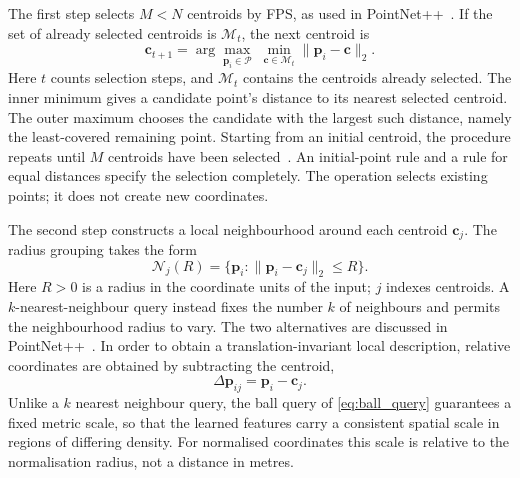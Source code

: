 The first step selects $M < N$ centroids by
\ac{FPS}, as used in PointNet++~\cite{qi2017pointnetpp}. If the set of already selected centroids is
$\mathcal{M}_t$, the next centroid is
%
\begin{equation}
    \label{eq:fps}
    \mathbf{c}_{t+1}
    = \arg\max_{\mathbf{p}_i \in \mathcal{P}}\;
      \min_{\mathbf{c} \in \mathcal{M}_t} \big\| \mathbf{p}_i - \mathbf{c} \big\|_2 .
\end{equation}
%
Here $t$ counts selection steps, and $\mathcal M_t$ contains the
centroids already selected. The inner minimum gives a candidate point's
distance to its nearest selected centroid. The outer maximum chooses the
candidate with the largest such distance, namely the least-covered
remaining point. Starting from an initial centroid, the procedure repeats
until $M$ centroids have been selected~\cite{qi2017pointnetpp}.
An initial-point rule and a rule for equal distances specify the selection
completely. The operation selects existing points; it does not create
new coordinates.

The second step constructs a local neighbourhood
around each centroid $\mathbf{c}_j$. The radius grouping takes the form
%
\begin{equation}
    \label{eq:ball_query}
    \mathcal{N}_j(R) = \big\{ \mathbf{p}_i : \| \mathbf{p}_i - \mathbf{c}_j \|_2 \le R \big\}.
\end{equation}
%
Here $R>0$ is a radius in the coordinate units of the input; $j$ indexes centroids. A $k$-nearest-neighbour query instead fixes the number $k$ of neighbours and permits the neighbourhood radius to vary. The two alternatives are discussed in PointNet++~\cite{qi2017pointnetpp}. In order to
obtain a translation-invariant local description, relative coordinates are
obtained by subtracting the centroid,
%
\begin{equation}
    \label{eq:relative_coords}
    \Delta \mathbf{p}_{ij} = \mathbf{p}_i - \mathbf{c}_j .
\end{equation}
%
Unlike a $k$ nearest neighbour query, the ball query of
\eqref{eq:ball_query} guarantees a fixed metric scale, so that the learned
features carry a consistent spatial scale in regions of differing
density. For normalised coordinates this scale is relative to the normalisation radius, not a distance in metres.

